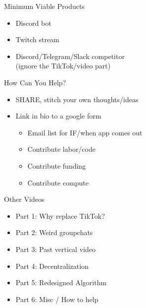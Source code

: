 \documentclass[aspectratio=35]{beamer} %
\begin{document}
\begin{frame}{Minimum Viable Products}
\vspace{-1.5in}
\begin{itemize}
    \item Discord bot
    \item Twitch stream
    \item Discord/Telegram/Slack competitor\\(ignore the TikTok/video part)
\end{itemize}
\end{frame}

\begin{frame}{How Can You Help?}
\vspace{-1.5in}
\begin{itemize}
    \item SHARE, stitch your own thoughts/ideas
    \item Link in bio to a google form
    \begin{itemize}
        \item Email list for IF/when app comes out
        \item Contribute labor/code
        \item Contribute funding
        \item Contribute compute
    \end{itemize}
\end{itemize}
\end{frame}

\begin{frame}{Other Videos}
\centering
\tiny
\vspace{-1.5in}
\begin{itemize}
    \item Part 1: Why replace TikTok?
    \item Part 2: Weird groupchats 
    \item Part 3: Past vertical video
    \item Part 4: Decentralization
    \item Part 5: Redesigned Algorithm
    \item Part 6: Misc / How to help
\end{itemize}
\end{frame}
\end{document}
